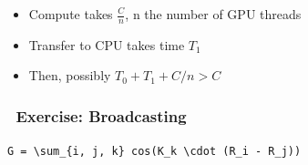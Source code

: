 \begin{Shaded}
\begin{Highlighting}[]

  \NormalTok{af::array gpuRs(A.size(), Rs.size(), Rs[}\NormalTok{].data());}
\end{Highlighting}
\end{Shaded}

\begin{itemize}
\itemsep1pt\parskip0pt
\item
  Compute takes $\frac{C}{n}$, n the number of GPU threads
\end{itemize}

\begin{Shaded}
\begin{Highlighting}[]

    
      \NormalTok{), }\NormalTok{));}
\end{Highlighting}
\end{Shaded}

\begin{itemize}
\itemsep1pt\parskip0pt
\item
  Transfer to CPU takes time $T_1$
\end{itemize}

\begin{Shaded}
\begin{Highlighting}[]

  \NormalTok{af::array gpuRs(A.size(), Rs.size(), Rs[}\NormalTok{].data());}
\end{Highlighting}
\end{Shaded}

\begin{itemize}
\itemsep1pt\parskip0pt
\item
  Then, possibly $T_0 + T_1 + C/n > C$
\end{itemize}

\subsubsection{~Exercise: Broadcasting}\label{exercise-broadcasting}

\texttt{G = \textbackslash{}sum\_\{i, j, k\} cos(K\_k \textbackslash{}cdot (R\_i - R\_j))}

